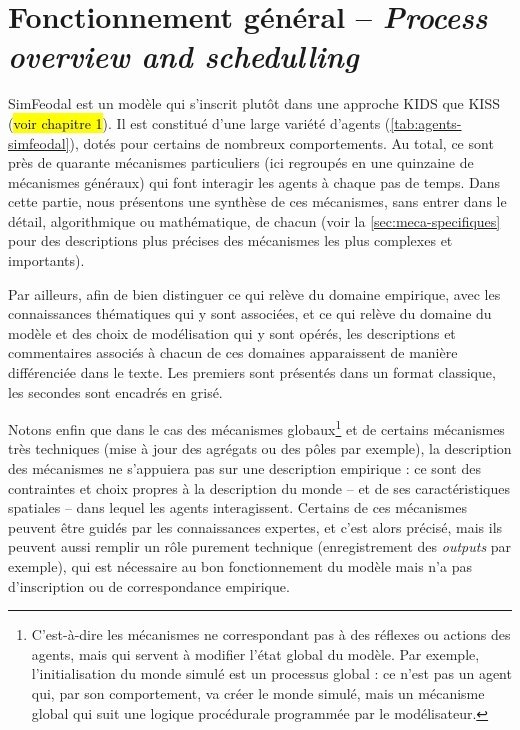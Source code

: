 \let\orisectionmark\sectionmark
\renewcommand\sectionmark[1]{}%
\section[Fonctionnement général -- \textit{Process overview and schedulling}]{Fonctionnement général -- \large{\textit{Process overview and schedulling}}\label{sec:fonctionnement-general}}
\orisectionmark{Fonctionnement général}
\let\sectionmark\orisectionmark

SimFeodal est un modèle qui s'inscrit plutôt dans une approche KIDS que KISS (\hl{voir chapitre 1}).
Il est constitué d'une large variété d'agents (\cref{tab:agents-simfeodal}), dotés pour certains de nombreux comportements.
Au total, ce sont près de quarante mécanismes particuliers (ici regroupés en une quinzaine de mécanismes généraux) qui font interagir les agents à chaque pas de temps.
Dans cette partie, nous présentons une synthèse de ces mécanismes, sans entrer dans le détail, algorithmique ou mathématique, de chacun (voir la \cref{sec:meca-specifiques} pour des descriptions plus précises des mécanismes les plus complexes et importants).

Par ailleurs, afin de bien distinguer ce qui relève du domaine empirique, avec les connaissances thématiques qui y sont associées, et ce qui relève du domaine du modèle et des choix de modélisation qui y sont opérés, les descriptions et commentaires associés à chacun de ces domaines apparaissent de manière différenciée dans le texte.
Les premiers sont présentés dans un format classique, les secondes sont encadrés en grisé.

Notons enfin que dans le cas des \og mécanismes globaux\fg{}\footnote{
	C'est-à-dire les mécanismes ne correspondant pas à des \og réflexes\fg{} ou actions des agents, mais qui servent à modifier l'état \og global\fg{} du modèle.
	Par exemple, l'initialisation du monde simulé est un processus global : ce n'est pas un agent qui, par son comportement, va créer le monde simulé, mais un mécanisme global qui suit une logique procédurale programmée par le modélisateur.
} et de certains mécanismes très techniques (mise à jour des agrégats ou des pôles par exemple), la description des mécanismes ne s'appuiera pas sur une description empirique : ce sont des contraintes et choix propres à la description du monde -- et de ses caractéristiques spatiales -- dans lequel les agents interagissent.
Certains de ces mécanismes peuvent être guidés par les connaissances expertes, et c'est alors précisé, mais ils peuvent aussi remplir un rôle purement technique (enregistrement des \textit{outputs} par exemple), qui est nécessaire au bon fonctionnement du modèle mais n'a pas d'inscription ou de correspondance empirique.

